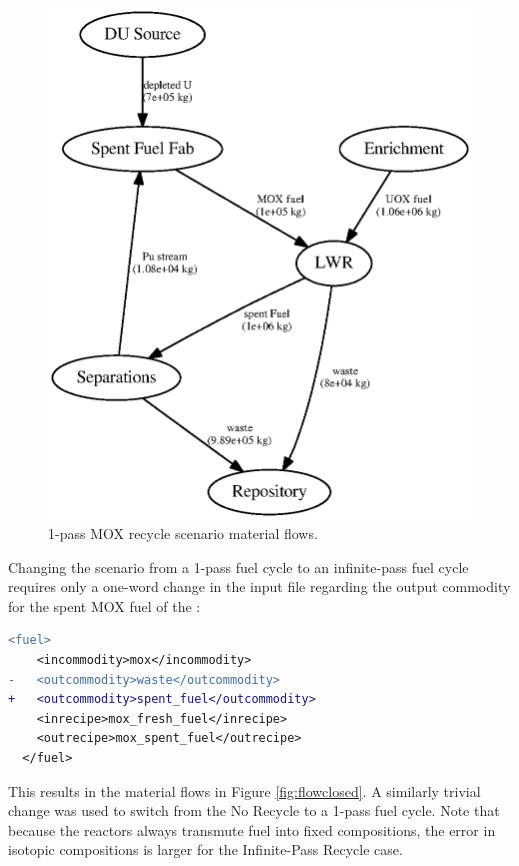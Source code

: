 \begin{figure}
\begin{center}
\includegraphics[width=\columnwidth]{./images/flow-mod-open-1.eps}
\end{center}
\caption{1-pass \gls{MOX} recycle scenario material flows.}
\label{fig:flowmodopen}
\end{figure}

Changing the scenario from a 1-pass fuel cycle to an infinite-pass fuel cycle
requires only a one-word change in the input file regarding the output
commodity for the spent \gls{MOX} fuel of the :

\begin{lstlisting}[language=diff]
  <fuel>
    <incommodity>mox</incommodity>
-   <outcommodity>waste</outcommodity>
+   <outcommodity>spent_fuel</outcommodity>
    <inrecipe>mox_fresh_fuel</inrecipe>
    <outrecipe>mox_spent_fuel</outrecipe>
  </fuel>
\end{lstlisting}

This results in the material flows in Figure \ref{fig:flowclosed}.  A
similarly trivial change was used to switch from the No Recycle to a 1-pass
fuel cycle.  Note that because the reactors always transmute fuel into fixed
compositions, the error in isotopic compositions is larger for the
Infinite-Pass Recycle case.

